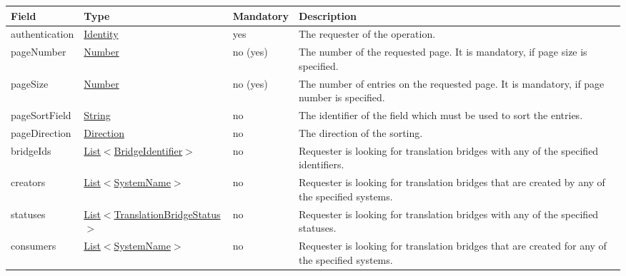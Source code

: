 \documentclass[a4paper]{arrowhead}
\newcommand{\pref}[1]{{\textcolor{ArrowheadGrey}{\hyperref[sec:model:primitives:#1]{#1}}}}
\begin{document}
\begin{table}[ht!]
\begin{tabularx}{\textwidth}{| p{3.5cm} | p{4.6cm} | p{2cm} | X |} \hline
\rowcolor{gray!33} Field & Type & Mandatory & Description \\ \hline
authentication & \hyperref[sec:model:Identity]{Identity} & yes & The requester of the ope\-ration. \\ \hline
pageNumber & \pref{Number} & no (yes) & The number of the requested page. It is mandatory, if page size is specified. \\ \hline
pageSize & \pref{Number} & no (yes) & The number of entries on the requested page. It is mandatory, if page number is specified. \\ \hline
pageSortField & \pref{String} & no & The identifier of the field which must be used to sort the entries. \\ \hline
pageDirection & \pref{Direction} & no & The direction of the sorting. \\ \hline
bridgeIds &  \pref{List}$<$\pref{BridgeIdentifier}$>$ & no & Requester is looking for translation bridges with any of the spe\-cified identifiers. \\ \hline
creators &  \pref{List}$<$\pref{SystemName}$>$ & no & Requester is looking for translation bridges that are created by any of the specified systems. \\ \hline
statuses & \pref{List}$<$\pref{TranslationBridgeStatus}$>$ & no & Requester is looking for translation bridges with any of the specified statuses. \\ \hline
consumers &  \pref{List}$<$\pref{SystemName}$>$ & no & Requester is looking for translation bridges that are created for any of the specified systems. \\ \hline
\end{tabularx}
\end{table}
\end{document}

